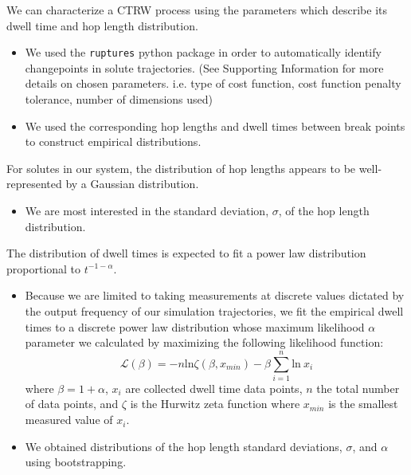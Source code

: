 \documentclass{article}
\begin{document}
  \noindent We can characterize a CTRW process using the parameters which describe its
  dwell time and hop length distribution.  %
  \begin{itemize}
	\item We used the \texttt{ruptures} python package in order to automatically identify
	changepoints in solute trajectories.\cite{truong_ruptures:_2018} (See Supporting
	Information for more details on chosen parameters. i.e. type of cost function, 
	cost function penalty tolerance, number of dimensions used)
	\item We used the corresponding hop lengths and dwell times between break points
	to construct empirical distributions.
  \end{itemize}
	
  For solutes in our system, the distribution of hop lengths appears to be
  well-represented by a Gaussian distribution.~\cite{metzler_random_2000,
  metzler_anomalous_2014,neusius_subdiffusion_2009}  %
  \begin{itemize}
	\item We are most interested in the standard deviation, $\sigma$, of the 
	hop length distribution.
  \end{itemize}
  
  \noindent The distribution of dwell times is expected to fit a power law
  distribution proportional to $t^{-1-\alpha}$.~\cite{meroz_toolbox_2015}
  \begin{itemize}
	\item Because we are limited to taking measurements at discrete values
	dictated by the output frequency of our simulation trajectories, we fit the
	empirical dwell times to a discrete power law distribution whose maximum
	likelihood $\alpha$ parameter we calculated by maximizing the following
	likelihood function: 
    \begin{equation}
	\mathcal{L}(\beta) = -n\text{ln}\zeta(\beta, x_{min}) -
	\beta\sum_{i=1}^{n} \text{ln}~x_i 
	\label{eqn:powerlaw_likelihood}
	\end{equation}
	where $\beta = 1 + \alpha$, $x_i$ are collected dwell time data points,
	$n$ the total number of data points, and $\zeta$ is the Hurwitz zeta function
	where $x_{min}$ is the smallest measured value of
	$x_i$.~\cite{clauset_power-law_2009} 
	\item We obtained distributions of the hop length standard deviations, $\sigma$, and
	$\alpha$ using bootstrapping.\cite{efron_introduction_1994} 
  \end{itemize}
  
\end{document}
